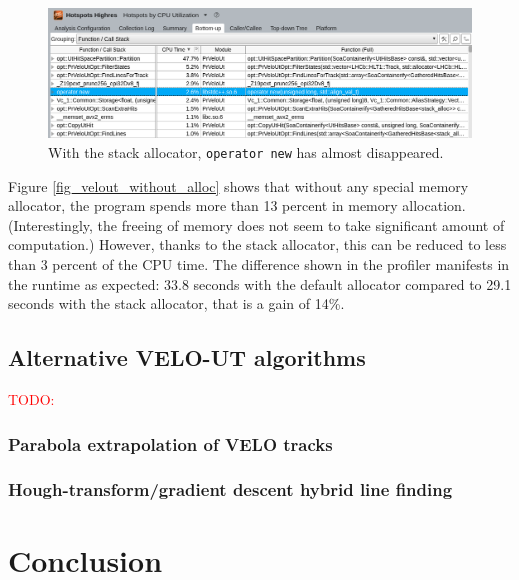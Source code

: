 \documentclass[12pt]{article}
\newcommand{\code}[1]{\texttt{#1}}
\begin{document}
\begin{figure}[H]
	\begin{center}
		\includegraphics[width=\textwidth]{velout_with_alloc}
	\end{center}
	\caption{With the stack allocator, \code{operator new} has almost disappeared.}
	\label{fig_velout_with_alloc}
\end{figure}

Figure \ref{fig_velout_without_alloc} shows that without any special memory allocator, the program spends more than 13 percent in memory allocation. (Interestingly, the freeing of memory does not seem to take significant amount of computation.) However, thanks to the stack allocator, this can be reduced to less than 3 percent of the CPU time. The difference shown in the profiler manifests in the runtime as expected: 33.8 seconds with the default allocator compared to 29.1 seconds with the stack allocator, that is a gain of 14\%.


\subsection{Alternative VELO-UT algorithms}\label{sec_velout_alternative}

\textcolor{red}{TODO:}

\subsubsection{Parabola extrapolation of VELO tracks}

\subsubsection{Hough-transform/gradient descent hybrid line finding}


\newpage
\section{Conclusion}
\end{document}

